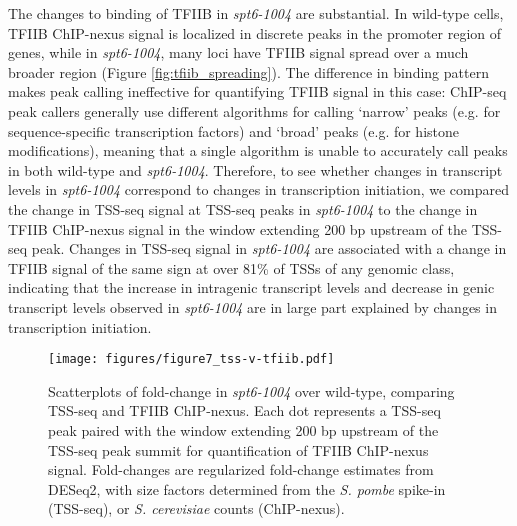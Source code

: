\documentclass[9pt, letterpaper]{article}
\begin{document}
The changes to binding of TFIIB in \textit{spt6-1004} are substantial. In wild-type cells, TFIIB ChIP-nexus signal is localized in discrete peaks in the promoter region of genes, while in \textit{spt6-1004}, many loci have TFIIB signal spread over a much broader region (Figure \ref{fig:tfiib_spreading}). The difference in binding pattern makes peak calling ineffective for quantifying TFIIB signal in this case: ChIP-seq peak callers generally use different algorithms for calling `narrow' peaks (e.g. for sequence-specific transcription factors) and `broad' peaks (e.g. for histone modifications), meaning that a single algorithm is unable to accurately call peaks in both wild-type and \textit{spt6-1004}. Therefore, to see whether changes in transcript levels in \textit{spt6-1004} correspond to changes in transcription initiation, we compared the change in TSS-seq signal at TSS-seq peaks in \textit{spt6-1004} to the change in TFIIB ChIP-nexus signal in the window extending 200 bp upstream of the TSS-seq peak. Changes in TSS-seq signal in \textit{spt6-1004} are associated with a change in TFIIB signal of the same sign at over 81\% of TSSs of any genomic class, indicating that the increase in intragenic transcript levels and decrease in genic transcript levels observed in \textit{spt6-1004} are in large part explained by changes in transcription initiation.


\begin{figure}[h]
\centering
\texttt{[image: figures/figure7\_tss-v-tfiib.pdf]}
\caption{Scatterplots of fold-change in \textit{spt6-1004} over wild-type, comparing TSS-seq and TFIIB ChIP-nexus. Each dot represents a TSS-seq peak paired with the window extending 200 bp upstream of the TSS-seq peak summit for quantification of TFIIB ChIP-nexus signal. Fold-changes are regularized fold-change estimates from DESeq2, with size factors determined from the \textit{S. pombe} spike-in (TSS-seq), or \textit{S. cerevisiae} counts (ChIP-nexus).}
\end{figure}
\end{document}
